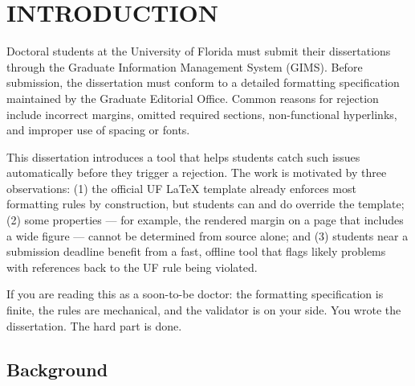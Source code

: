 
\chapter{INTRODUCTION}\label{ch:intro}

Doctoral students at the University of Florida must submit their
dissertations through the Graduate Information Management System
(GIMS). Before submission, the dissertation must conform to a detailed
formatting specification maintained by the Graduate Editorial Office.
Common reasons for rejection include incorrect margins, omitted
required sections, non-functional hyperlinks, and improper use of
spacing or fonts.

This dissertation introduces a tool that helps students catch such
issues automatically before they trigger a rejection. The work is
motivated by three observations: (1) the official UF LaTeX template
already enforces most formatting rules by construction, but students
can and do override the template; (2) some properties --- for example,
the rendered margin on a page that includes a wide figure --- cannot be
determined from source alone; and (3) students near a submission
deadline benefit from a fast, offline tool that flags likely
problems with references back to the UF rule being violated.

If you are reading this as a soon-to-be doctor: the formatting
specification is finite, the rules are mechanical, and the validator
is on your side. You wrote the dissertation. The hard part is done.

\section{Background}

